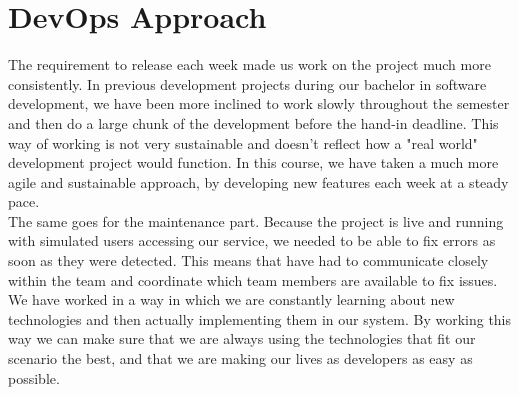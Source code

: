\section{DevOps Approach}

The requirement to release each week made us work on the project much more consistently. In previous development projects during our bachelor in software development, we have been more inclined to work slowly throughout the semester and then do a large chunk of the development before the hand-in deadline. This way of working is not very sustainable and doesn't reflect how a "real world" development project would function. In this course, we have taken a much more agile and sustainable approach, by developing new features each week at a steady pace.\\

The same goes for the maintenance part. Because the project is live and running with simulated users accessing our service, we needed to be able to fix errors as soon as they were detected. This means that have had to communicate closely within the team and coordinate which team members are available to fix issues.\\

We have worked in a way in which we are constantly learning about new technologies and then actually implementing them in our system. By working this way we can make sure that we are always using the technologies that fit our scenario the best, and that we are making our lives as developers as easy as possible.